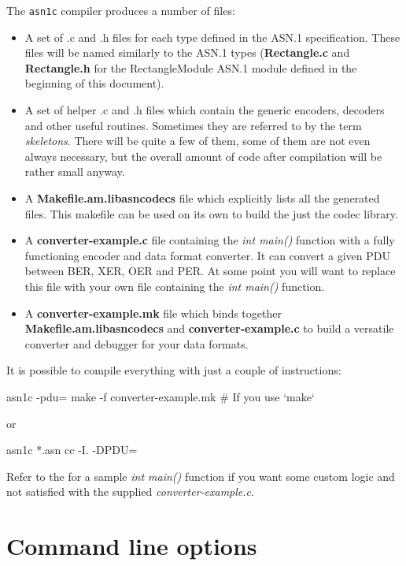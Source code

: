 \documentclass[english,oneside,12pt]{book}
\newcommand{\cmd}[1]{\texttt{#1}}
\begin{document}
The \cmd{asn1c} compiler produces a number of files:
\begin{itemize}
\item A set of .c and .h files for each type defined
in the ASN.1 specification. These files will be named similarly to
the ASN.1 types (\textbf{Rectangle.c} and \textbf{Rectangle.h} for the
RectangleModule ASN.1 module defined in the beginning of this document).
\item A set of helper .c and .h files which contain the generic encoders,
decoders and other useful routines.
Sometimes they are referred to by the term \emph{skeletons}.
There will be quite a few of them, some
of them are not even always necessary, but the overall amount of code
after compilation will be rather small anyway.
\item A \textbf{Makefile.am.libasncodecs} file which explicitly lists all the
generated files.
This makefile can be used on its own to build the just the codec library.
\item A \textbf{converter-example.c} file containing the \emph{int main()} function with a fully functioning encoder and data format converter. It can convert a given PDU between BER, XER, OER and PER. At some point you will want to replace this file with your own file containing the \emph{int main()} function.
\item A \textbf{converter-example.mk} file which binds together
\textbf{Makefile.am.libasncodecs} and \textbf{converter-example.c}
to build a versatile converter and debugger for your data formats.
\end{itemize}
It is possible to compile everything with just a couple of instructions:
\begin{bash}
asn1c -pdu=%
make -f converter-example.mk                   # If you use `make`
\end{bash}
or
\begin{bash}
asn1c *.asn
cc -I. -DPDU=%
\end{bash}
Refer to the  for a sample
\emph{int main()} function if you want some custom logic and not satisfied
with the supplied \emph{converter-example.c}.

\clearpage{}
\section{\label{sec:Command-line-options}Command line options}
\end{document}
